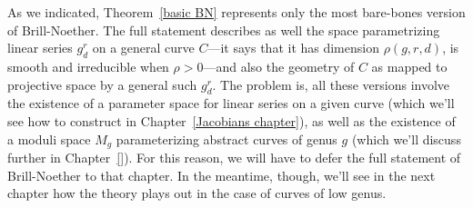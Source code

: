 As we indicated, Theorem~\ref{basic BN} represents only the most bare-bones version of Brill-Noether. The full statement describes as well the space parametrizing linear series $g^r_d$ on a general curve $C$---it says that it has dimension $\rho(g,r,d)$, is smooth and irreducible when $\rho > 0$---and also the geometry of $C$ as mapped to projective space by a general such $g^r_d$. The problem is, all these versions involve the existence of a parameter space for linear series on a given curve (which we'll see how to construct in Chapter~\ref{Jacobians chapter}), as well as the existence of a moduli space $M_g$ parameterizing abstract curves of genus $g$ (which we'll discuss further in Chapter~\ref{}). For this reason, we will have to defer the full statement of Brill-Noether to that chapter. In the meantime, though, we'll see in the next chapter how the theory plays out in the case of curves of low genus.


